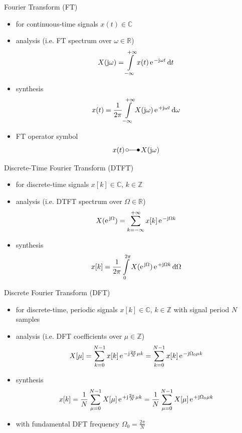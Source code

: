 \documentclass[mathserif, aspectratio=43]{intbeamer}
\begin{document}
\begin{frame}{Fourier Transform (FT)}
\begin{itemize}
\item for continuous-time signals $x(t)\in\mathbb{C}$
\item analysis (i.e. FT spectrum over $\omega\in\mathbb{R}$)
$$X(\im\omega) = \int\limits_{-\infty}^{+\infty} x(t) \,\e^{-\im \omega t}\,\mathrm{d}t$$
\item synthesis
$$x(t) = \frac{1}{2\pi}\int\limits_{-\infty}^{+\infty} X(\im\omega) \,\e^{+\im \omega t}\,\mathrm{d}\omega
$$
\item FT operator symbol $$x(t) \,\laplace\,  X(\im\omega)$$
\end{itemize}
\end{frame}



\begin{frame}{Discrete-Time Fourier Transform (DTFT)}
\begin{itemize}
\item for discrete-time signals $x[k]\in\mathbb{C}$, $k\in\mathbb{Z}$
\item analysis (i.e. DTFT spectrum over $\Omega\in\mathbb{R}$)
$$X(\e^{\im\Omega}) = \sum\limits_{k=-\infty}^{+\infty} x[k] \,\e^{-\im \Omega k}$$
\item synthesis
$$x[k] = \frac{1}{2\pi}\int\limits_{0}^{2\pi} X(\e^{\im\Omega}) \,\e^{+\im \Omega k}\,\mathrm{d}\Omega
$$
\end{itemize}
\end{frame}






\begin{frame}{Discrete Fourier Transform (DFT)}
%
\begin{itemize}
\item for discrete-time, periodic signals $x[k]\in\mathbb{C}$, $k\in\mathbb{Z}$
with signal period $N$ samples
\item analysis (i.e. DFT coefficients over $\mu\in\mathbb{Z}$)
$$X[\mu] = \sum\limits_{k=0}^{N-1} x[k] \,\e^{-\im \frac{2\pi}{N} \mu k} =
\sum\limits_{k=0}^{N-1} x[k] \,\e^{-\im \Omega_0 \mu k}$$
\item synthesis
$$x[k] = \frac{1}{N}\sum\limits_{\mu=0}^{N-1} X[\mu] \,\e^{+\im \frac{2\pi}{N} \mu k} =
\frac{1}{N}\sum\limits_{\mu=0}^{N-1} X[\mu] \,\e^{+\im \Omega_0 \mu k}$$
\item with fundamental DFT frequency $\Omega_0 = \frac{2\pi}{N}$
\end{itemize}
%
\end{frame}
\end{document}
